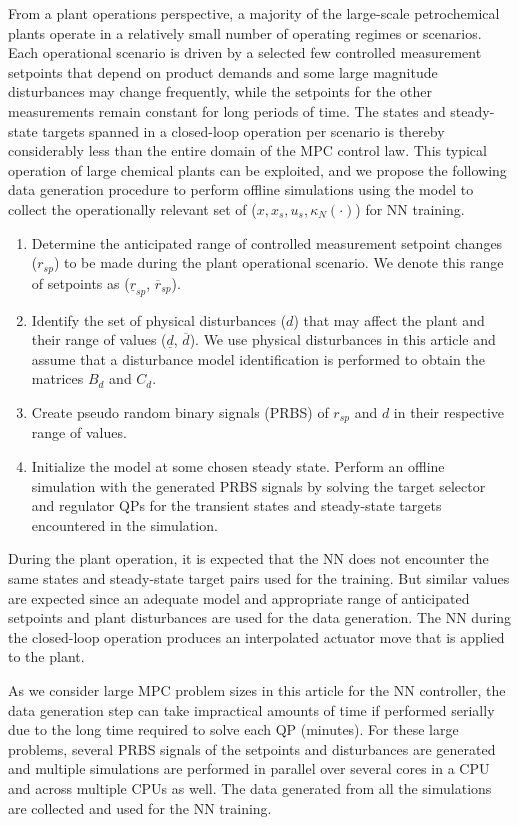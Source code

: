 \documentclass[preprint,5p, twocolumn, authoryear]{elsarticle}
\begin{document}
From a plant operations perspective, a majority of the large-scale petrochemical
plants operate in a relatively small number of operating regimes or scenarios.
Each operational scenario is driven by a selected few controlled measurement
setpoints that depend on product demands and some large magnitude disturbances
may change frequently, while the setpoints for the other measurements remain
constant for long periods of time. The states and steady-state targets spanned
in a closed-loop operation per scenario is thereby considerably less than the
entire domain of the MPC control law. This typical operation of large chemical
plants can be exploited, and we propose the following data generation procedure
to perform offline simulations using the model to collect the operationally
relevant set of ($x, x_s, u_s, \kappa_N(\cdot)$) for NN training.

\begin{enumerate}
    \item Determine the anticipated range of controlled measurement setpoint
    changes ($r_{sp}$) to be made during the plant operational scenario. We
    denote this range of setpoints as ($\underline{r}_{sp}$,
    $\overline{r}_{sp}$).
    \item Identify the set of physical disturbances ($d$) that may affect the
    plant and their range of values ($\underline{d}$, $\overline{d}$). We use
    physical disturbances in this article and assume that a disturbance model
    identification is performed to obtain the matrices $B_d$ and $C_d$.
    \item Create pseudo random binary signals (PRBS) of $r_{sp}$ and $d$ in
    their respective range of values.
    \item Initialize the model at some chosen steady state. Perform an offline
    simulation with the generated PRBS signals by solving the target selector
    and regulator QPs for the transient states and steady-state targets
    encountered in the simulation. 
\end{enumerate}

During the plant operation, it is expected that the NN does not encounter the
same states and steady-state target pairs used for the training. But similar
values are expected since an adequate model and appropriate range of anticipated
setpoints and plant disturbances are used for the data generation. The NN during
the closed-loop operation produces an interpolated actuator move that is applied
to the plant. 

As we consider large MPC problem sizes in this article for the NN controller,
the data generation step can take impractical amounts of time if performed
serially due to the long time required to solve each QP (minutes). For these
large problems, several PRBS signals of the setpoints and disturbances are
generated and multiple simulations are performed in parallel over several cores
in a CPU and across multiple CPUs as well. The data generated from all the
simulations are collected and used for the NN training.
\end{document}

